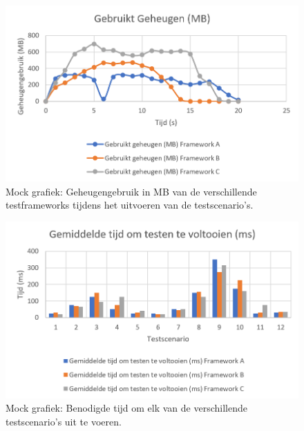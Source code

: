     \begin{figure}[h!]
    \includegraphics[width=\linewidth]{img/gebruiktgeheugen.PNG}
    \caption{Mock grafiek: Geheugengebruik in MB van de verschillende testframeworks tijdens het uitvoeren van de testscenario's.}
    \label{fig:geheugenmock}
    \end{figure}

    \begin{figure}[h!]
    \includegraphics[width=\linewidth]{img/gemtijdtestenvoltooien.PNG}
    \caption{Mock grafiek: Benodigde tijd om elk van de verschillende testscenario's uit te voeren.}
    \label{fig:uitvoertijdmock}
    \end{figure}


